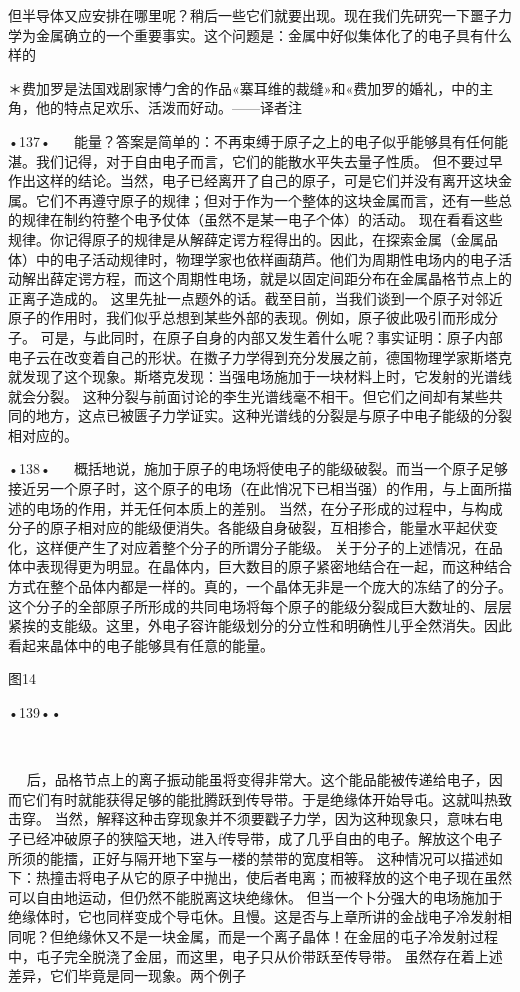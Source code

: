 但半导体又应安排在哪里呢？稍后一些它们就要出现。现在我们先研究一下噩子力学为金属确立的一个重要事实。这个问题是：金属中好似集体化了的电子具有什么样的

＊费加罗是法国戏剧家博勹舍的作品«寨耳维的裁缝»和«费加罗的婚礼，中的主角，他的特点足欢乐、活泼而好动。——译者注

•137•
  
能量？答案是简单的：不再束缚于原子之上的电子似乎能够具有任何能湛。我们记得，对于自由电子而言，它们的能散水平失去量子性质。
但不要过早作出这样的结论。当然，电子已经离开了自己的原子，可是它们并没有离开这块金属。它们不再遵守原子的规律；但对于作为一个整体的这块金属而言，还有一些总的规律在制约符整个电予仗体（虽然不是某一电子个体）的活动。
现在看看这些规律。你记得原子的规律是从解薛定谔方程得出的。因此，在探索金属（金属品体）中的电子活动规律时，物理学家也依样画葫芦。他们为周期性电场内的电子活动解出薛定谔方程，而这个周期性电场，就是以固定间距分布在金属晶格节点上的正离子造成的。
这里先扯一点题外的话。截至目前，当我们谈到一个原子对邻近原子的作用时，我们似乎总想到某些外部的表现。例如，原子彼此吸引而形成分子。
可是，与此同时，在原子自身的内部又发生着什么呢？事实证明：原子内部电子云在改变着自己的形状。在擞子力学得到充分发展之前，德国物理学家斯塔克就发现了这个现象。斯塔克发现：当强电场施加于一块材料上时，它发射的光谱线就会分裂。
这种分裂与前面讨论的李生光谱线毫不相干。但它们之间却有某些共同的地方，这点已被匮子力学证实。这种光谱线的分裂是与原子中电子能级的分裂相对应的。

•138•
  
概括地说，施加于原子的电场将使电子的能级破裂。而当一个原子足够接近另一个原子时，这个原子的电场（在此悄况下已相当强）的作用，与上面所描述的电场的作用，并无任何本质上的差别。
当然，在分子形成的过程中，与构成分子的原子相对应的能级便消失。各能级自身破裂，互相掺合，能量水平起伏变化，这样便产生了对应着整个分子的所谓分子能级。
关于分子的上述情况，在品体中表现得更为明显。在晶体内，巨大数目的原子紧密地结合在一起，而这种结合方式在整个品体内都是一样的。真的，一个晶体无非是一个庞大的冻结了的分子。
这个分子的全部原子所形成的共同电场将每个原子的能级分裂成巨大数址的、层层紧挨的支能级。这里，外电子容许能级划分的分立性和明确性儿乎全然消失。因此看起来晶体中的电子能够具有任意的能量。

 

图14

•139••
  





  







  
后，品格节点上的离子振动能虽将变得非常大。这个能品能被传递给电子，因而它们有时就能获得足够的能批腾跃到传导带。于是绝缘体开始导屯。这就叫热致击穿。
当然，解释这种击穿现象并不须要戳子力学，因为这种现象只，意味右电子已经冲破原子的狭隘天地，进入f传导带，成了几乎自由的电子。解放这个电子所须的能擂，正好与隔开地下室与一楼的禁带的宽度相等。
这种情况可以描述如下：热撞击将电子从它的原子中抛出，使后者电离；而被释放的这个电子现在虽然可以自由地运动，但仍然不能脱离这块绝缘休。
但当一个卜分强大的电场施加于绝缘体时，它也同样变成个导屯休。且慢。这是否与上章所讲的金战电子冷发射相同呢？但绝缘休又不是一块金属，而是一个离子晶体！在金屈的屯子冷发射过程中，屯子完全脱浇了金屈，而这里，电子只从价带跃至传导带。
虽然存在着上述差异，它们毕竟是同一现象。两个例子

